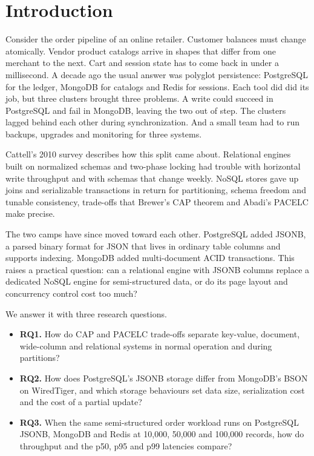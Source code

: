 \documentclass[conference,a4paper]{IEEEtran}
\begin{document}
\section{Introduction}
Consider the order pipeline of an online retailer. Customer balances must change atomically. Vendor product catalogs arrive in shapes that differ from one merchant to the next. Cart and session state has to come back in under a millisecond. A decade ago the usual answer was polyglot persistence: PostgreSQL for the ledger, MongoDB for catalogs and Redis for sessions. Each tool did did its job, but three clusters brought three problems. A write could succeed in PostgreSQL and fail in MongoDB, leaving the two out of step. The clusters lagged behind each other during synchronization. And a small team had to run backups, upgrades and monitoring for three systems.

Cattell's 2010 survey \cite{cattell2010} describes how this split came about. Relational engines built on normalized schemas and two-phase locking had trouble with horizontal write throughput and with schemas that change weekly. NoSQL stores gave up joins and serializable transactions in return for partitioning, schema freedom and tunable consistency, trade-offs that Brewer's CAP theorem \cite{brewer2012} and Abadi's PACELC \cite{abadi2012} make precise.

The two camps have since moved toward each other. PostgreSQL added JSONB, a parsed binary format for JSON that lives in ordinary table columns and supports indexing. MongoDB added multi-document ACID transactions. This raises a practical question: can a relational engine with JSONB columns replace a dedicated NoSQL engine for semi-structured data, or do its page layout and concurrency control cost too much?

We answer it with three research questions.
\begin{itemize}
\item \textbf{RQ1.} How do CAP and PACELC trade-offs separate key-value, document, wide-column and relational systems in normal operation and during partitions?
\item \textbf{RQ2.} How does PostgreSQL's JSONB storage differ from MongoDB's BSON on WiredTiger, and which storage behaviours set data size, serialization cost and the cost of a partial update?
\item \textbf{RQ3.} When the same semi-structured order workload runs on PostgreSQL JSONB, MongoDB and Redis at 10,000, 50,000 and 100,000 records, how do throughput and the p50, p95 and p99 latencies compare?
\end{itemize}
\end{document}

